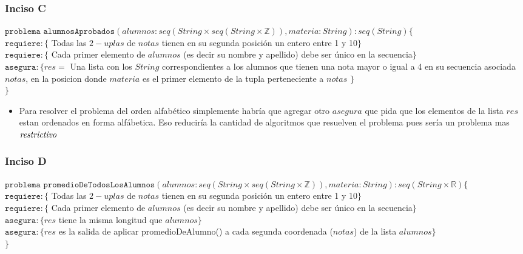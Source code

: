 	\subsubsection{Inciso C}
	$\texttt{problema alumnosAprobados}(alumnos:seq(String \times seq(String \times \mathbb{Z})),materia:String) : seq(String) \lbrace$\\
	$\texttt{requiere}:\lbrace$ Todas las $2-uplas$ de $notas$ tienen en su segunda posición un entero entre 1 y 10$\rbrace$\\
	$\texttt{requiere}:\lbrace$ Cada primer elemento de $alumnos$ (es decir su nombre y apellido) debe ser único en la secuencia$\rbrace$\\
	$\texttt{asegura}:\lbrace res=$ Una lista con los $String$ correspondientes a los alumnos que tienen una nota mayor o igual a 4 en su secuencia asociada $notas$, en la posicion donde $materia$ es el primer elemento de la tupla perteneciente a $notas$ $\rbrace$\\
	$\rbrace$\\
	\begin{itemize}
	\item Para resolver el problema del orden alfabético simplemente habría que agregar otro $asegura$ que pida que los elementos de la lista $res$ estan ordenados en forma alfábetica. Eso reduciría la cantidad de algoritmos que resuelven el problema pues sería un problema mas $\emph{restrictivo}$
	\end{itemize}
	
	\subsubsection{Inciso D}
	$\texttt{problema promedioDeTodosLosAlumnos}(alumnos:seq(String \times seq(String \times \mathbb{Z})),materia:String) : seq(String \times \mathbb{R}) \lbrace$\\
	$\texttt{requiere}:\lbrace$ Todas las $2-uplas$ de $notas$ tienen en su segunda posición un entero entre 1 y 10$\rbrace$\\
	$\texttt{requiere}:\lbrace$ Cada primer elemento de $alumnos$ (es decir su nombre y apellido) debe ser único en la secuencia$\rbrace$\\
	$\texttt{asegura}:\lbrace res$ tiene la misma longitud que $alumnos\rbrace$\\
	$\texttt{asegura}:\lbrace res$ es la salida de aplicar promedioDeAlumno() a cada segunda coordenada ($notas$) de la lista $alumnos\rbrace$\\
	$\rbrace$
